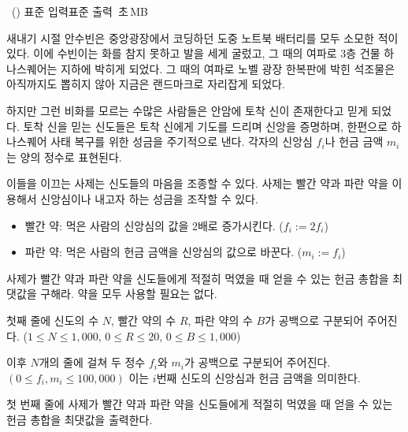 \begin{problem}{\kcpcprobfaith\ (\kcpcprobfaithshort)}
    {표준 입력}{표준 출력}
    {\kcpcprobfaithtime\,초}{\kcpcprobfaithmemory\,MB}{}
    
    새내기 시절 안수빈은 중앙광장에서 코딩하던 도중 노트북 배터리를 모두 소모한 적이 있다. 이에 수빈이는 화를 참지 못하고 발을 세게 굴렀고, 그 때의 여파로 3층 건물 하나스퀘어는 지하에 박히게 되었다. 그 때의 여파로 노벨 광장 한복판에 박힌 석조물은 아직까지도 뽑히지 않아 지금은 랜드마크로 자리잡게 되었다.
    
    하지만 그런 비화를 모르는 수많은 사람들은 안암에 토착 신이 존재한다고 믿게 되었다. 토착 신을 믿는 신도들은 토착 신에게 기도를 드리며 신앙을 증명하며, 한편으로 하나스퀘어 사태 복구를 위한 성금을 주기적으로 낸다. 각자의 신앙심 $f_i$나 헌금 금액 $m_i$는 양의 정수로 표현된다.
    
    이들을 이끄는 사제는 신도들의 마음을 조종할 수 있다. 사제는 빨간 약과 파란 약을 이용해서 신앙심이나 내고자 하는 성금을 조작할 수 있다.
    
    \begin{itemize}
    \item 빨간 약: 먹은 사람의 신앙심의 값을 2배로 증가시킨다. ($f_i := 2 f_i$)
    \item 파란 약: 먹은 사람의 헌금 금액을 신앙심의 값으로 바꾼다. ($m_i := f_i$)
    \end{itemize}
    
    사제가 빨간 약과 파란 약을 신도들에게 적절히 먹였을 때 얻을 수 있는 헌금 총합을 최댓값을 구해라. 약을 모두 사용할 필요는 없다. 
    
    
    \InputFile
    첫째 줄에 신도의 수 $N$, 빨간 약의 수 $R$, 파란 약의 수 $B$가 공백으로 구분되어 주어진다. ($1 \le N \le 1,000$, $0 \le R\le 20$, $0 \le B \le 1,000$)
    
    이후 $N$개의 줄에 걸쳐 두 정수 $f_i$와 $m_i$가 공백으로 구분되어 주어진다. $(0 \leq f_i, m_i \leq 100,000)$ 이는 $i$번째 신도의 신앙심과 헌금 금액을 의미한다.
    
    \OutputFile
    첫 번째 줄에 사제가 빨간 약과 파란 약을 신도들에게 적절히 먹였을 때 얻을 수 있는 헌금 총합을 최댓값을 출력한다.
    
    \Examples
    \begin{example}
    \end{example}
\end{problem}

